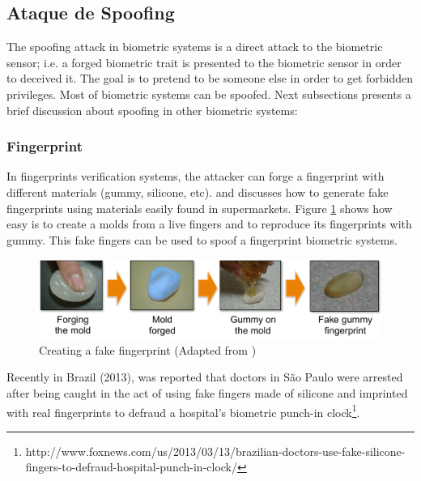 \subsection{Ataque de Spoofing}

The spoofing attack in biometric systems is a direct attack to the biometric sensor; i.e. a forged biometric trait is presented to the biometric sensor in order to deceived it. The goal is to pretend to be someone else in order to get forbidden privileges. Most of biometric systems can be spoofed. Next subsections presents a brief discussion about spoofing in other biometric systems:

\subsubsection{Fingerprint}

In fingerprints verification systems, the attacker can forge a fingerprint with different materials (gummy, silicone, etc). \cite{matsumoto2002impact} and \cite{leyden2002gummi} discusses how to generate fake fingerprints using materials easily found in supermarkets. Figure \ref{fig:finger_attack} shows how easy is to create a molds from a live fingers and to reproduce its fingerprints with gummy. This fake fingers can be used  to spoof a fingerprint biometric systems.

\begin{figure}[!htb]
\begin{center}
\includegraphics [width=16cm] {images/finger_print_attack.pdf}
\caption[Creating a fake fingerprint]{Creating a fake fingerprint (Adapted from \cite{matsumoto2002impact})} \label{fig:finger_attack}
\end{center}
\end{figure}

Recently in Brazil (2013), was reported that doctors in S\~ao Paulo were arrested after being caught in the act of using fake fingers made of silicone and imprinted with real fingerprints to defraud a hospital's biometric punch-in clock\footnote{http://www.foxnews.com/us/2013/03/13/brazilian-doctors-use-fake-silicone-fingers-to-defraud-hospital-punch-in-clock/}.

